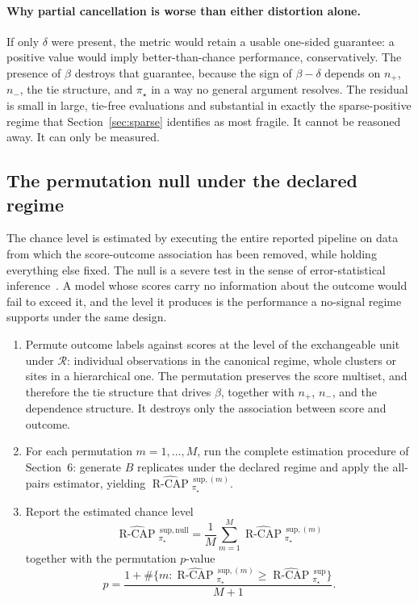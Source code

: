 \documentclass[11pt]{article}
\newcommand{\Regime}{\mathcal{R}}
\newcommand{\RCAPHat}{\widehat{\operatorname{R\text{-}CAP}}{}^{\,\mathrm{sup}}_{\pi_\star}}
\newcommand{\RCAPnullHat}{\widehat{\operatorname{R\text{-}CAP}}{}^{\,\mathrm{sup,null}}_{\pi_\star}}
\theoremstyle{remark}
\begin{document}
\paragraph{Why partial cancellation is worse than either distortion alone.}
If only $\delta$ were present, the metric would retain a usable one-sided guarantee: a positive value would imply better-than-chance performance, conservatively. The presence of $\beta$ destroys that guarantee, because the sign of $\beta-\delta$ depends on $n_+$, $n_-$, the tie structure, and $\pi_\star$ in a way no general argument resolves. The residual is small in large, tie-free evaluations and substantial in exactly the sparse-positive regime that Section~\ref{sec:sparse} identifies as most fragile. It cannot be reasoned away. It can only be measured.

\subsection{The permutation null under the declared regime}

The chance level is estimated by executing the entire reported pipeline on data from which the score-outcome association has been removed, while holding everything else fixed. The null is a severe test in the sense of error-statistical inference~\cite{mayo1996error}. A model whose scores carry no information about the outcome would fail to exceed it, and the level it produces is the performance a no-signal regime supports under the same design.

\begin{enumerate}
\item Permute outcome labels against scores at the level of the exchangeable unit under $\Regime$: individual observations in the canonical regime, whole clusters or sites in a hierarchical one. The permutation preserves the score multiset, and therefore the tie structure that drives $\beta$, together with $n_+$, $n_-$, and the dependence structure. It destroys only the association between score and outcome.
\item For each permutation $m=1,\ldots,M$, run the complete estimation procedure of Section~6: generate $B$ replicates under the declared regime and apply the all-pairs estimator, yielding $\widehat{\operatorname{R\text{-}CAP}}{}^{\,\mathrm{sup},(m)}_{\pi_\star}$.
\item Report the estimated chance level
\[
\RCAPnullHat=\frac{1}{M}\sum_{m=1}^{M}\widehat{\operatorname{R\text{-}CAP}}{}^{\,\mathrm{sup},(m)}_{\pi_\star}
\]
together with the permutation $p$-value
\[
p=\frac{1+\#\{m:\widehat{\operatorname{R\text{-}CAP}}{}^{\,\mathrm{sup},(m)}_{\pi_\star}\geq\RCAPHat\}}{M+1}.
\]
\end{enumerate}
\end{document}
